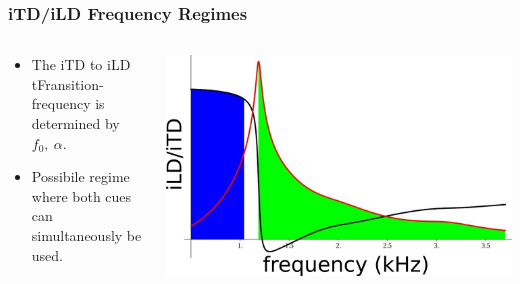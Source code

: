 \documentclass{beamer}
\begin{document}
\begin{frame}
\frametitle{iTD/iLD Frequency Regimes}
\begin{columns}
\begin{column}{0.5\textwidth}
\begin{exampleblock}{}
\small
 \begin{itemize}
  \item The iTD to iLD tFransition-frequency is determined by $f_0,\ \alpha$.
  \item Possibile regime where both cues can simultaneously be used.
 \end{itemize}
\end{exampleblock}
\end{column}
     \begin{column}{0.5\textwidth}
      \includegraphics[width = 6 cm]{Diagrams/Presentation/tokayregions.png}
\end{column}
\end{columns}
\end{frame}
\end{document}
